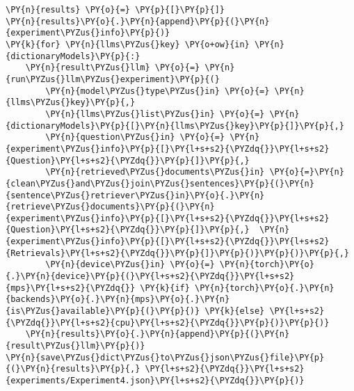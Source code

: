 \documentclass[11pt]{wseas}
\begin{document}
\begin{tcolorbox}[breakable, size=fbox, boxrule=1pt, pad at break*=1mm,colback=cellbackground, colframe=cellborder]
\begin{Verbatim}[commandchars=\\\{\}]
\PY{n}{results} \PY{o}{=} \PY{p}{[}\PY{p}{]}
\PY{n}{results}\PY{o}{.}\PY{n}{append}\PY{p}{(}\PY{n}{experiment\PYZus{}info}\PY{p}{)}
\PY{k}{for} \PY{n}{llms\PYZus{}key} \PY{o+ow}{in} \PY{n}{dictionaryModels}\PY{p}{:}
    \PY{n}{result\PYZus{}llm} \PY{o}{=} \PY{n}{run\PYZus{}llm\PYZus{}experiment}\PY{p}{(}
        \PY{n}{model\PYZus{}type\PYZus{}in} \PY{o}{=} \PY{n}{llms\PYZus{}key}\PY{p}{,}
        \PY{n}{llms\PYZus{}list\PYZus{}in} \PY{o}{=} \PY{n}{dictionaryModels}\PY{p}{[}\PY{n}{llms\PYZus{}key}\PY{p}{]}\PY{p}{,}
        \PY{n}{question\PYZus{}in} \PY{o}{=} \PY{n}{experiment\PYZus{}info}\PY{p}{[}\PY{l+s+s2}{\PYZdq{}}\PY{l+s+s2}{Question}\PY{l+s+s2}{\PYZdq{}}\PY{p}{]}\PY{p}{,}
        \PY{n}{retrieved\PYZus{}documents\PYZus{}in} \PY{o}{=}\PY{n}{clean\PYZus{}and\PYZus{}join\PYZus{}sentences}\PY{p}{(}\PY{n}{sentence\PYZus{}retriever\PYZus{}in}\PY{o}{.}\PY{n}{retrieve\PYZus{}documents}\PY{p}{(}\PY{n}{experiment\PYZus{}info}\PY{p}{[}\PY{l+s+s2}{\PYZdq{}}\PY{l+s+s2}{Question}\PY{l+s+s2}{\PYZdq{}}\PY{p}{]}\PY{p}{,}  \PY{n}{experiment\PYZus{}info}\PY{p}{[}\PY{l+s+s2}{\PYZdq{}}\PY{l+s+s2}{Retrievals}\PY{l+s+s2}{\PYZdq{}}\PY{p}{]}\PY{p}{)}\PY{p}{)}\PY{p}{,}
        \PY{n}{device\PYZus{}in} \PY{o}{=} \PY{n}{torch}\PY{o}{.}\PY{n}{device}\PY{p}{(}\PY{l+s+s2}{\PYZdq{}}\PY{l+s+s2}{mps}\PY{l+s+s2}{\PYZdq{}} \PY{k}{if} \PY{n}{torch}\PY{o}{.}\PY{n}{backends}\PY{o}{.}\PY{n}{mps}\PY{o}{.}\PY{n}{is\PYZus{}available}\PY{p}{(}\PY{p}{)} \PY{k}{else} \PY{l+s+s2}{\PYZdq{}}\PY{l+s+s2}{cpu}\PY{l+s+s2}{\PYZdq{}}\PY{p}{)}\PY{p}{)}
    \PY{n}{results}\PY{o}{.}\PY{n}{append}\PY{p}{(}\PY{n}{result\PYZus{}llm}\PY{p}{)}
\PY{n}{save\PYZus{}dict\PYZus{}to\PYZus{}json\PYZus{}file}\PY{p}{(}\PY{n}{results}\PY{p}{,} \PY{l+s+s2}{\PYZdq{}}\PY{l+s+s2}{experiments/Experiment4.json}\PY{l+s+s2}{\PYZdq{}}\PY{p}{)}  
\end{Verbatim}
\end{tcolorbox}
\end{document}

